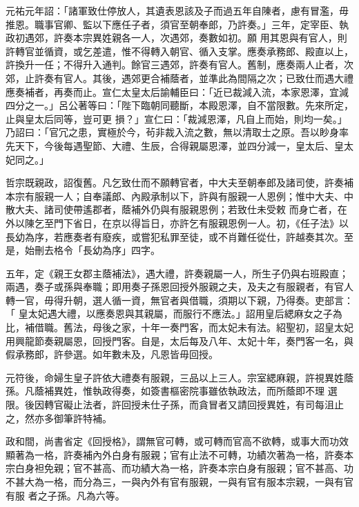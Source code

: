 \begin{pinyinscope}
 元祐元年詔：「諸軍致仕停放人，其遺表恩該及子而過五年自陳者，慮有冒濫，毋推恩。職事官卿、監以下應任子者，須官至朝奉郎，乃許奏。」三年，定宰臣、執政初遇郊，許奏本宗異姓親各一人，次遇郊，奏數如初。願
 用其恩與有官人，則許轉官並循資，或乞差遣，惟不得轉入朝官、循入支掌。應奏承務郎、殿直以上，許換升一任；不得升入通判。餘官三遇郊，許奏有官人。舊制，應奏兩人止者，次郊，止許奏有官人。其後，遇郊更合補蔭者，並準此為間隔之次；已致仕而遇大禮應奏補者，再奏而止。宣仁太皇太后諭輔臣曰：「近已裁減入流，本家恩澤，宜減四分之一。」呂公著等曰：「陛下臨朝同聽斷，本殿恩澤，自不當限數。先來所定，止與皇太后同等，豈可更
 損？」宣仁曰：「裁減恩澤，凡自上而始，則均一矣。」乃詔曰：「官冗之患，實極於今，茍非裁入流之數，無以清取士之原。吾以眇身率先天下，今後每遇聖節、大禮、生辰，合得親屬恩澤，並四分減一，皇太后、皇太妃同之。」



 哲宗既親政，詔復舊。凡乞致仕而不願轉官者，中大夫至朝奉郎及諸司使，許奏補本宗有服親一人；自奉議郎、內殿承制以下，許與有服親一人恩例；惟中大夫、中散大夫、諸司使帶遙郡者，蔭補外仍與有服親恩例；若致仕未受敕
 而身亡者，在外以陳乞至門下省日，在京以得旨日，亦許乞有服親恩例一人。初，《任子法》以長幼為序，若應奏者有廢疾，或嘗犯私罪至徒，或不肖難任從仕，許越奏其次。至是，始刪去格令「長幼為序」四字。



 五年，定《親王女郡主蔭補法》，遇大禮，許奏親屬一人，所生子仍與右班殿直；兩遇，奏子或孫與奉職；即用奏子孫恩回授外服親之夫，及夫之有服親者，有官人轉一官，毋得升朝，選人循一資，無官者與借職，須期以下親，乃得奏。吏部言：「
 皇太妃遇大禮，以應奏恩與其親屬，而服行不應法。」詔用皇后緦麻女之子為比，補借職。舊法，母後之家，十年一奏門客，而太妃未有法。紹聖初，詔皇太妃用興龍節奏親屬恩，回授門客。自是，太后每及八年、太妃十年，奏門客一名，與假承務郎，許參選。如年數未及，凡恩皆毋回授。



 元符後，命婦生皇子許依大禮奏有服親，三品以上三人。宗室緦麻親，許視異姓蔭孫。凡蔭補異姓，惟執政得奏，如簽書樞密院事雖依執政法，而所蔭即不理
 選限。後因轉官礙止法者，許回授未仕子孫，而貪冒者又請回授異姓，有司每沮止之，然亦多御筆許特補。



 政和間，尚書省定《回授格》，謂無官可轉，或可轉而官高不欲轉，或事大而功效顯著為一格，許奏補內外白身有服親；官有止法不可轉，功績次著為一格，許奏本宗白身袒免親；官不甚高、而功績大為一格，許奏本宗白身有服親；官不甚高、功不甚大為一格，而分為三，一與內外有官有服親，一與有官有服本宗親，一與有官有服
 者之子孫。凡為六等。




\end{pinyinscope}
